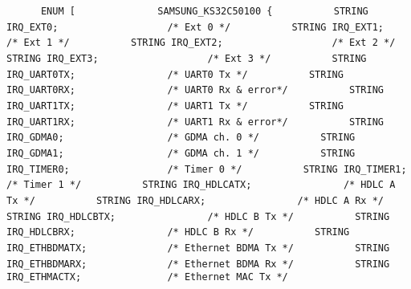 {{{{\lstinline!! \newline
\lstinline!      ENUM [! \newline
\lstinline!	    ! \newline
\lstinline!        SAMSUNG_KS32C50100 {! \newline
\lstinline!          STRING IRQ_EXT0;                   /* Ext 0 */! \newline
\lstinline!          STRING IRQ_EXT1;                   /* Ext 1 */! \newline
\lstinline!          STRING IRQ_EXT2;                   /* Ext 2 */! \newline
\lstinline!          STRING IRQ_EXT3;                   /* Ext 3 */! \newline
\lstinline!          STRING IRQ_UART0TX;                /* UART0 Tx */! \newline
\lstinline!          STRING IRQ_UART0RX;                /* UART0 Rx & error*/! \newline
\lstinline!          STRING IRQ_UART1TX;                /* UART1 Tx */! \newline
\lstinline!          STRING IRQ_UART1RX;                /* UART1 Rx & error*/! \newline
\lstinline!          STRING IRQ_GDMA0;                  /* GDMA ch. 0 */! \newline
\lstinline!          STRING IRQ_GDMA1;                  /* GDMA ch. 1 */! \newline
\lstinline!          STRING IRQ_TIMER0;                 /* Timer 0 */! \newline
\lstinline!          STRING IRQ_TIMER1;                 /* Timer 1 */! \newline
\lstinline!          STRING IRQ_HDLCATX;                /* HDLC A Tx */! \newline
\lstinline!          STRING IRQ_HDLCARX;                /* HDLC A Rx */! \newline
\lstinline!          STRING IRQ_HDLCBTX;                /* HDLC B Tx */! \newline
\lstinline!          STRING IRQ_HDLCBRX;                /* HDLC B Rx */! \newline
\lstinline!          STRING IRQ_ETHBDMATX;              /* Ethernet BDMA Tx */! \newline
\lstinline!          STRING IRQ_ETHBDMARX;              /* Ethernet BDMA Rx */! \newline
\lstinline!          STRING IRQ_ETHMACTX;               /* Ethernet MAC Tx */! \newline
}}}}

